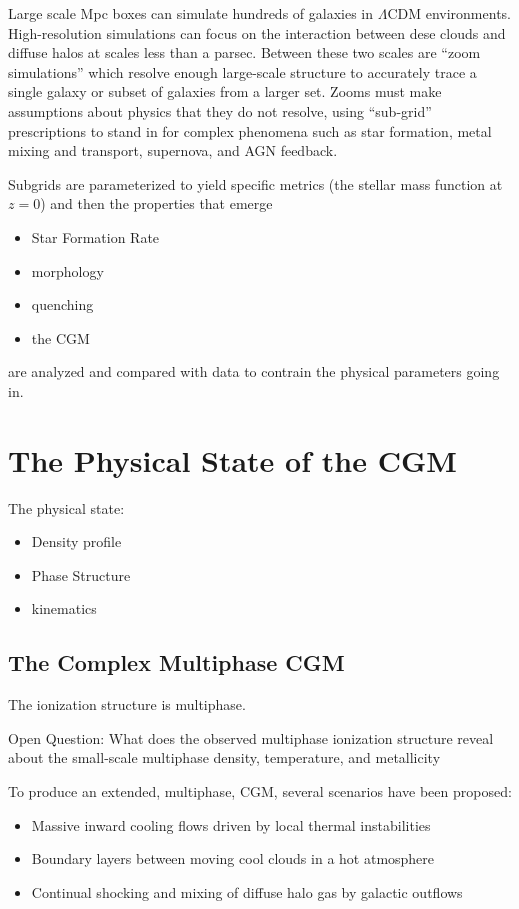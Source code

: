 \documentclass[12pt]{article}
\begin{document}
Large scale Mpc boxes can simulate hundreds of galaxies in $\Lambda$CDM environments.
High-resolution simulations can focus on the interaction between dese clouds and diffuse halos at scales
less than a parsec.
Between these two scales are ``zoom simulations'' which resolve enough large-scale structure to accurately
trace a single galaxy or subset of galaxies from a larger set. Zooms must make assumptions about physics
that they do not resolve, using ``sub-grid'' prescriptions to stand in for complex phenomena such as star
formation, metal mixing and transport, supernova, and AGN feedback.

Subgrids are parameterized to yield specific metrics (the stellar mass function at $z=0$) and then
the properties that emerge
\begin{itemize}
\item{Star Formation Rate}
\item{morphology}
\item{quenching}
  \item{the CGM}
\end{itemize}

are analyzed and compared with data to contrain the physical parameters going in. 

\section{The Physical State of the CGM}

The physical state:
\begin{itemize}
\item{Density profile}
\item{Phase Structure}
\item{kinematics}
\end{itemize}


\subsection{The Complex Multiphase CGM}

The ionization structure is multiphase. 


Open Question: What does the observed multiphase ionization structure reveal about the small-scale multiphase density, temperature, and metallicity

To produce an extended, multiphase, CGM, several scenarios have been proposed:

\begin{itemize}
\item{Massive inward cooling flows driven by local thermal instabilities}
\item{Boundary layers between moving cool clouds in a hot atmosphere}
\item{Continual shocking and mixing of diffuse halo gas by galactic outflows}
\end{itemize}
\end{document}
